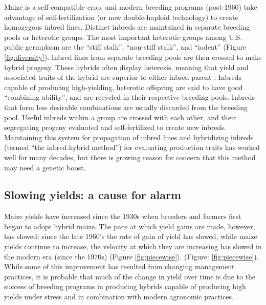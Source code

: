 \documentclass[12pt]{article}
\begin{document}
Maize is  a self-compatible crop, and modern breeding programs (post-1960) take advantage of self-fertilization (or now double-haploid technology) to create homozygous inbred lines. 
Distinct inbreds are maintained in separate breeding pools or heterotic groups.
The most important heterotic groups among U.S. public germplasm are the ``stiff stalk'', ``non-stiff stalk'', and ``iodent'' (Figure \ref{fig:diversity}).
Inbred lines from separate breeding pools are then crossed to make hybrid progeny.  
These hybrids often display heterosis, meaning that yield and associated traits of the hybrid are superior to  either inbred parent \citep{Springer:2007bj}.  
Inbreds capable of producing high-yielding, heterotic offspring are said to have good ``combining ability'', and are recycled in their respective breeding pools.
Inbreds that form less desirable combinations are usually discarded from the breeding pool. 
Useful inbreds within a group are crossed with each other, and their segregating progeny evaluated and self-fertilized to create new inbreds. 
Maintaining this system for propagation of inbred lines and hybridizing inbreds (termed ``the inbred-hybrid method'') for evaluating production traits has worked well for many decades, but there is growing reason for concern that this method may need a genetic boost. 

\subsection*{Slowing yields: a cause for alarm} 

Maize yields have increased since the 1930s when breeders and farmers first began to adopt hybrid maize.
The pace at which yield gains are made, however, has slowed: since the late 1960's the rate of gain of yield has slowed, while maize yields continue to increase, the velocity at which they are increasing has slowed in the modern era (since the 1970s) (Figure \ref{fig:piecewise}). 
%
%
 (Figure: \ref{fig:piecewise}).
While some of this improvement has resulted from changing management practices, it is probable that much of the change in yield over time is due to the success of breeding programs in producing hybrids capable of producing high yields under stress and in combination with modern agronomic practices.  \citep{Duvick:2001fy}. 
\end{document}
